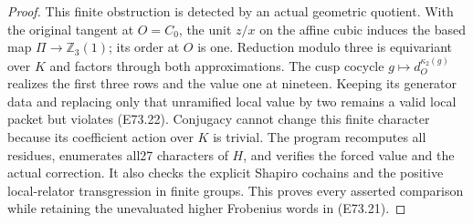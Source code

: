 \begin{proof}
This finite obstruction is detected by an actual
geometric quotient. With the original tangent
at $O=C_0$, the unit $z/x$ on the affine cubic
induces the based map $\Pi\to\mathbb Z_3(1)$;
its order at $O$ is one. Reduction modulo three
is equivariant over $K$ and factors through
both approximations. The cusp cocycle
$g\mapsto d_O^{\kappa_2(g)}$ realizes the first
three rows and the value one at nineteen.
Keeping its generator data and replacing only
that unramified local value by two remains a
valid local packet but violates (E73.22).
Conjugacy cannot change this finite character
because its coefficient action over $K$ is
trivial. The program recomputes all residues,
enumerates all27 characters of $H$, and verifies
the forced value and the actual correction.
It also checks the explicit Shapiro cochains
and the positive local-relator transgression
in finite groups. This proves every asserted
comparison while retaining the unevaluated
higher Frobenius words in (E73.21).
\end{proof}
